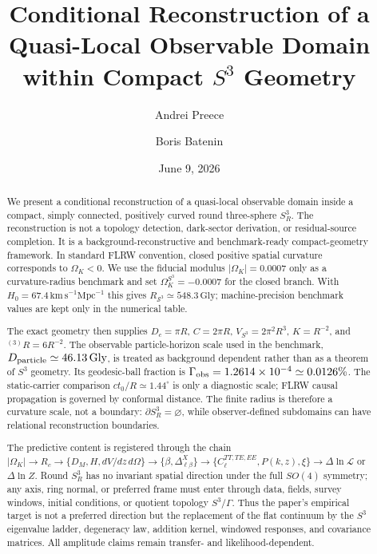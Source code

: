 \documentclass[aps,prd,onecolumn,superscriptaddress,longbibliography,nofootinbib,notitlepage]{revtex4-2}
\begin{document}
\raggedbottom

\title{Conditional Reconstruction of a Quasi-Local Observable Domain\\ within Compact \texorpdfstring{$S^3$}{S3} Geometry}

\author{Andrei Preece}

\author{Boris Batenin}

\date{June 9, 2026}

\begin{abstract}
We present a conditional reconstruction of a quasi-local observable domain inside a
compact, simply connected, positively curved round three-sphere $S^3_R$. The
reconstruction is not a topology detection, dark-sector derivation, or residual-source
completion. It is a background-reconstructive and benchmark-ready compact-geometry
framework. In standard FLRW convention, closed positive spatial curvature corresponds to
$\Omega_K<0$. We use the fiducial modulus $|\Omega_K|=0.0007$ only as a curvature-radius
benchmark and set $\Omega_K^{S^3}=-0.0007$ for the closed branch. With
$H_0=67.4\,\mathrm{km\,s}^{-1}\mathrm{Mpc}^{-1}$ this gives
$R_{\mathcal S^3}\simeq548.3\,\mathrm{Gly}$; machine-precision benchmark values are
kept only in the numerical table.

The exact geometry then supplies $D_c=\pi R$, $C=2\pi R$,
$V_{S^3}=2\pi^2R^3$, $K=R^{-2}$, and ${}^{(3)}R=6R^{-2}$. The observable particle-horizon
scale used in the benchmark, $D_{\rm particle}\simeq46.13\,\mathrm{Gly}$, is treated as
background dependent rather than as a theorem of $S^3$ geometry. Its geodesic-ball
fraction is $\Gamma_{\rm obs}=1.2614\times10^{-4}\simeq0.0126\%$. The static-carrier
comparison $ct_0/R\simeq1.44^\circ$ is only a diagnostic scale; FLRW causal propagation is
governed by conformal distance. The finite radius is therefore a curvature scale, not a
boundary: $\partial S^3_R=\varnothing$, while observer-defined subdomains can have
relational reconstruction boundaries.

The predictive content is registered through the chain
$|\Omega_K|\to R_c\to\{D_M,H,dV/dz\,d\Omega\}\to\{\beta,\Delta_{\ell\beta}^X\}\to
\{C_\ell^{TT,TE,EE},P(k,z),\xi\}\to\Delta\ln\mathcal L$ or $\Delta\ln Z$. Round
$S^3_R$ has no invariant spatial direction under the full $SO(4)$ symmetry; any axis,
ring normal, or preferred frame must enter through data, fields, survey windows, initial
conditions, or quotient topology $S^3/\Gamma$. Thus the paper's empirical target is not a
preferred direction but the replacement of the flat continuum by the $S^3$ eigenvalue
ladder, degeneracy law, addition kernel, windowed responses, and covariance matrices.
All amplitude claims remain transfer- and likelihood-dependent.
\end{abstract}
\end{document}
